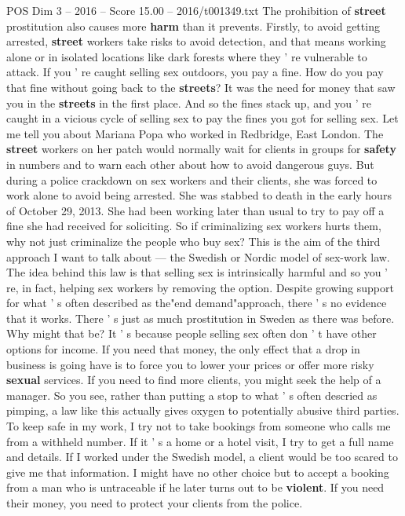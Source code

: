 \begin{textsample}{POS Dim 3 – 2016 – Score 15.00 – 2016/t001349.txt}
The prohibition of \textbf{street} prostitution also causes more \textbf{harm} than it prevents.
Firstly, to avoid getting arrested, \textbf{street} workers take risks to avoid detection, and that means working alone or in isolated locations like dark forests where they ' re vulnerable to attack.
If you ' re caught selling sex outdoors, you pay a fine.
How do you pay that fine without going back to the \textbf{streets}?
It was the need for money that saw you in the \textbf{streets} in the first place.
And so the fines stack up, and you ' re caught in a vicious cycle of selling sex to pay the fines you got for selling sex.
Let me tell you about Mariana Popa who worked in Redbridge, East London.
The \textbf{street} workers on her patch would normally wait for clients in groups for \textbf{safety} in numbers and to warn each other about how to avoid dangerous guys.
But during a police crackdown on sex workers and their clients, she was forced to work alone to avoid being arrested.
She was stabbed to death in the early hours of October 29, 2013.
She had been working later than usual to try to pay off a fine she had received for soliciting.
So if criminalizing sex workers hurts them, why not just criminalize the people who buy sex?
This is the aim of the third approach I want to talk about — the Swedish or Nordic model of sex-work law.
The idea behind this law is that selling sex is intrinsically harmful and so you ' re, in fact, helping sex workers by removing the option.
Despite growing support for what ' s often described as the"end demand"approach, there ' s no evidence that it works.
There ' s just as much prostitution in Sweden as there was before.
Why might that be?
It ' s because people selling sex often don ' t have other options for income.
If you need that money, the only effect that a drop in business is going have is to force you to lower your prices or offer more risky \textbf{sexual} services.
If you need to find more clients, you might seek the help of a manager.
So you see, rather than putting a stop to what ' s often descried as pimping, a law like this actually gives oxygen to potentially abusive third parties.
To keep safe in my work, I try not to take bookings from someone who calls me from a withheld number.
If it ' s a home or a hotel visit, I try to get a full name and details.
If I worked under the Swedish model, a client would be too scared to give me that information.
I might have no other choice but to accept a booking from a man who is untraceable if he later turns out to be \textbf{violent}.
If you need their money, you need to protect your clients from the police.

\end{textsample}
